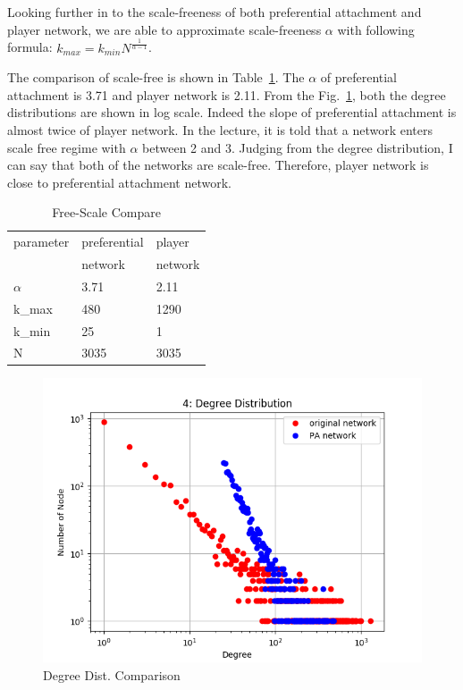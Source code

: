 \documentclass[runningheads]{llncs}
\begin{document}
Looking further in to the scale-freeness of both preferential attachment and player network, we are able to approximate scale-freeness \( \alpha \) with following formula:
\begin{math}
	k_{max} = k_{min}N^\frac{1}{\alpha -1}
\end{math}.

The comparison of scale-free is shown in Table~\ref{tab_free_scale_compare}. The \(\alpha\) of preferential attachment is 3.71 and player network is 2.11. From the Fig.~\ref{fig_4b_degree_dist_compare_log}, both the degree distributions are shown in log scale. Indeed the slope of preferential attachment is almost twice of player network. In the lecture, it is told that a network enters scale free regime with \(\alpha\) between 2 and 3. Judging from the degree distribution, I can say that both of the networks are scale-free. Therefore, player network is close to preferential attachment network. 

\begin{table}
\centering
\caption{Free-Scale Compare} \label{tab_free_scale_compare}
\begin{tabular}{|l|l|l|}
\hline
parameter & preferential  & player  \\
&  network &  network \\ \hline
\(\alpha\) & 3.71 & 2.11 \\ 
k_{max} & 480 & 1290 \\ 
k_{min} & 25 & 1 \\ 
N & 3035 & 3035 \\ \hline

\end{tabular}
\end{table}

\begin{figure} [H]
\centering
\includegraphics[width=\textwidth]{4_degree_dist_compare_log}
\caption{Degree Dist. Comparison} \label{fig_4b_degree_dist_compare_log}
\end{figure}
\end{document}
